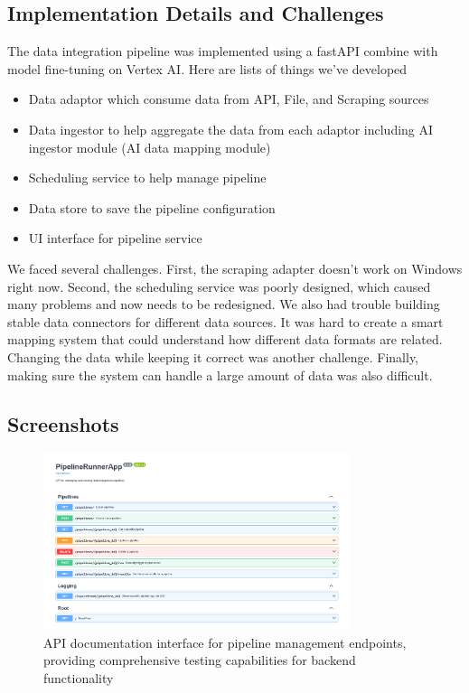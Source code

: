 \subsection{Implementation Details and Challenges}
The data integration pipeline was implemented using a fastAPI combine with model fine-tuning on Vertex AI.
Here are lists of things we've developed

\begin{itemize}
    \item Data adaptor which consume data from API, File, and Scraping sources
    \item Data ingestor to help aggregate the data from each adaptor including AI ingestor module (AI data mapping module)
    \item Scheduling service to help manage pipeline
    \item Data store to save the pipeline configuration
    \item UI interface for pipeline service
\end{itemize}

We faced several challenges. First, the scraping adapter doesn’t work on Windows right now. Second, the scheduling service was poorly designed, which caused many problems and now needs to be redesigned. We also had trouble building stable data connectors for different data sources. It was hard to create a smart mapping system that could understand how different data formats are related. Changing the data while keeping it correct was another challenge. Finally, making sure the system can handle a large amount of data was also difficult.

\subsection{Screenshots}

\begin{figure}[H]
    \centering
    \includegraphics[width=0.8\textwidth]{assets/api-doc.png}
    \caption{API documentation interface for pipeline management endpoints, providing comprehensive testing capabilities for backend functionality}
    \label{fig:api-doc}
\end{figure}

